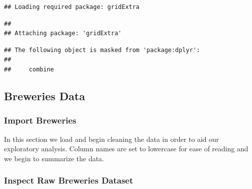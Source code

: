 \documentclass[]{article}
\newenvironment{Shaded}{\begin{snugshade}}{\end{snugshade}}
\newcommand{\KeywordTok}[1]{\textcolor[rgb]{0.13,0.29,0.53}{\textbf{#1}}}
\newcommand{\DataTypeTok}[1]{\textcolor[rgb]{0.13,0.29,0.53}{#1}}
\newcommand{\StringTok}[1]{\textcolor[rgb]{0.31,0.60,0.02}{#1}}
\newcommand{\CommentTok}[1]{\textcolor[rgb]{0.56,0.35,0.01}{\textit{#1}}}
\newcommand{\OtherTok}[1]{\textcolor[rgb]{0.56,0.35,0.01}{#1}}
\newcommand{\OperatorTok}[1]{\textcolor[rgb]{0.81,0.36,0.00}{\textbf{#1}}}
\newcommand{\NormalTok}[1]{#1}
\begin{document}
\begin{verbatim}
## Loading required package: gridExtra
\end{verbatim}

\begin{verbatim}
## 
## Attaching package: 'gridExtra'
\end{verbatim}

\begin{verbatim}
## The following object is masked from 'package:dplyr':
## 
##     combine
\end{verbatim}

\subsection{Breweries Data}\label{breweries-data}

\subsubsection{Import Breweries}\label{import-breweries}

In this section we load and begin cleaning the data in order to aid our
exploratory analysis. Column names are set to lowercase for ease of
reading and we begin to summarize the data.

\begin{Shaded}
\end{Shaded}

\subsubsection{Inspect Raw Breweries
Dataset}\label{inspect-raw-breweries-dataset}
\end{document}

